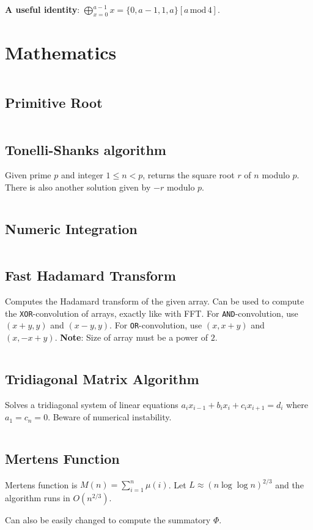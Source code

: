 \documentclass[8pt,a4paper,landscape,oneside]{amsart}
\newcommand{\mintedstyle}[2]{\inputminted[fontsize=\normalsize,baselinestretch=.9,breaklines,tabsize=2]{#1}{code/#2}}
\newcommand{\code}[1]{\mintedstyle{cpp}{#1}}
\newif\ifverbose
\begin{document}
\begin{multicols*}{3}
\textbf{A useful identity}: $\bigoplus_{x=0}^{a - 1} x = \{0, a - 1, 1, a\}[a \, \mathrm{mod} \, 4]$.

\section{Mathematics}

\code{math/math.cpp}

\subsection{Primitive Root}
\code{math/primitive_root.cpp}

\subsection{Tonelli-Shanks algorithm}
Given prime $p$ and integer $1\leq n<p$, returns the square root $r$ of
$n$ modulo $p$. There is also another solution given by $-r$ modulo
$p$.
\code{math/tonelli_shanks.cpp}

\subsection{Numeric Integration}
\ifverbose
Numeric integration using Simpson's rule.
\fi
\code{math/numeric_integration.cpp}

\subsection{Fast Hadamard Transform}
Computes the Hadamard transform of the given array. Can be used to
compute the \texttt{XOR}-convolution of arrays, exactly like with FFT.
For \texttt{AND}-convolution, use $(x+y,y)$ and $(x-y,y)$. For
\texttt{OR}-convolution, use $(x,x+y)$ and $(x,-x+y)$. \textbf{Note}:
Size of array must be a power of $2$.
\code{math/fht.cpp}

\subsection{Tridiagonal Matrix Algorithm}
Solves a tridiagonal system of linear equations $a_ix_{i-1} + b_ix_i +
c_ix_{i+1} = d_i$ where $a_1 = c_n = 0$. Beware of numerical
instability.
\code{math/tridiagonal.cpp}

\subsection{Mertens Function}
        Mertens function is $M(n) = \sum_{i=1}^n \mu(i)$. Let $L\approx
        (n\log{\log{n}})^{2/3}$ and the algorithm runs in $O(n^{2/3})$.
        \ifverbose
        \else
            Can also be easily changed to compute the summatory $\Phi$.
        \fi
        \code{math/mertens.cpp}


\end{multicols*}
\end{document}
